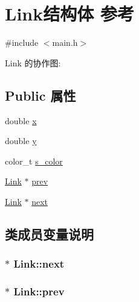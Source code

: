\hypertarget{struct_link}{}\section{Link结构体 参考}
\label{struct_link}


{\ttfamily \#include $<$main.\+h$>$}



Link 的协作图\+:
\subsection*{Public 属性}
\begin{DoxyCompactItemize}
\item 
double \hyperlink{struct_link_a7d8ad6030eb88738aa2b76ba600fff20}{x}
\item 
double \hyperlink{struct_link_a1763ac8834725fc439116fb9053e598e}{y}
\item 
color\+\_\+t \hyperlink{struct_link_a017dab4fa599bc8ee71f11f078ff1b20}{s\+\_\+color}
\item 
\hyperlink{struct_link}{Link} $\ast$ \hyperlink{struct_link_a56e46d2ef878ba6d42edb14d7d5b39d2}{prev}
\item 
\hyperlink{struct_link}{Link} $\ast$ \hyperlink{struct_link_ac8df761964be871b632e8203ce5a38aa}{next}
\end{DoxyCompactItemize}


\subsection{类成员变量说明}
\hypertarget{struct_link_ac8df761964be871b632e8203ce5a38aa}{}
\subsubsection[{next}]{ $\ast$ Link\+::next}\label{struct_link_ac8df761964be871b632e8203ce5a38aa}
\hypertarget{struct_link_a56e46d2ef878ba6d42edb14d7d5b39d2}{}
\subsubsection[{prev}]{ $\ast$ Link\+::prev}\label{struct_link_a56e46d2ef878ba6d42edb14d7d5b39d2}
\hypertarget{struct_link_a017dab4fa599bc8ee71f11f078ff1b20}{}
